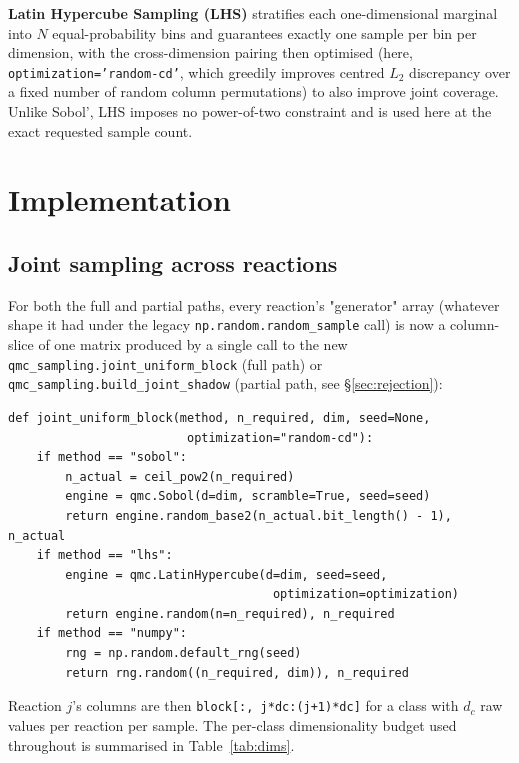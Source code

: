 \documentclass[11pt]{article}
\newcommand{\code}[1]{\texttt{#1}}
\begin{document}
\textbf{Latin Hypercube Sampling (LHS)} stratifies each one-dimensional marginal into $N$ equal-probability bins and guarantees exactly one sample per bin per dimension, with the cross-dimension pairing then optimised (here, \code{optimization='random-cd'}, which greedily improves centred $L_2$ discrepancy over a fixed number of random column permutations) to also improve joint coverage. Unlike Sobol', LHS imposes no power-of-two constraint and is used here at the exact requested sample count.

\section{Implementation}

\subsection{Joint sampling across reactions}

For both the full and partial paths, every reaction's "generator" array (whatever shape it had under the legacy \code{np.random.random\_sample} call) is now a column-slice of one matrix produced by a single call to the new \code{qmc\_sampling.joint\_uniform\_block} (full path) or \code{qmc\_sampling.build\_joint\_shadow} (partial path, see \S\ref{sec:rejection}):
\begin{lstlisting}
def joint_uniform_block(method, n_required, dim, seed=None,
                         optimization="random-cd"):
    if method == "sobol":
        n_actual = ceil_pow2(n_required)
        engine = qmc.Sobol(d=dim, scramble=True, seed=seed)
        return engine.random_base2(n_actual.bit_length() - 1), n_actual
    if method == "lhs":
        engine = qmc.LatinHypercube(d=dim, seed=seed,
                                     optimization=optimization)
        return engine.random(n=n_required), n_required
    if method == "numpy":
        rng = np.random.default_rng(seed)
        return rng.random((n_required, dim)), n_required
\end{lstlisting}
Reaction $j$'s columns are then \code{block[:, j*dc:(j+1)*dc]} for a class with $d_c$ raw values per reaction per sample. The per-class dimensionality budget used throughout is summarised in Table~\ref{tab:dims}.
\end{document}
